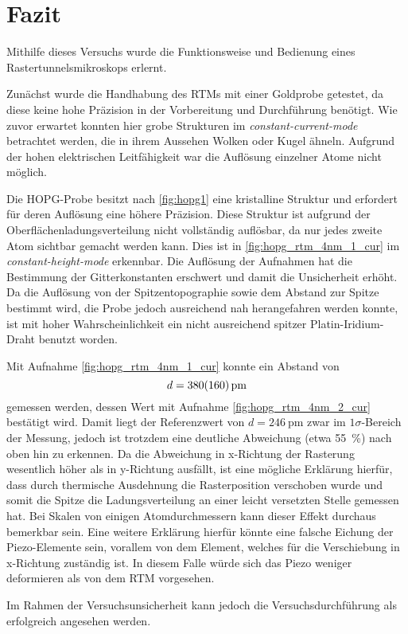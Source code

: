 \section{Fazit}\label{sec:fazit}
Mithilfe dieses Versuchs wurde die Funktionsweise und Bedienung eines Rastertunnelsmikroskops 
erlernt.\\\par
Zunächst wurde die Handhabung des RTMs mit einer Goldprobe getestet, da diese keine hohe 
Präzision in der Vorbereitung und Durchführung benötigt. Wie zuvor 
erwartet konnten hier grobe Strukturen im \emph{constant-current-mode} betrachtet werden, 
die in ihrem Aussehen Wolken oder Kugel ähneln. Aufgrund der hohen elektrischen 
Leitfähigkeit war die Auflösung einzelner Atome nicht möglich.\\\par
Die HOPG-Probe besitzt nach \cref{fig:hopg1} eine kristalline Struktur und erfordert
für deren Auflösung eine höhere Präzision. Diese Struktur ist aufgrund 
der Oberflächenladungsverteilung nicht vollständig auflösbar, da nur jedes zweite Atom sichtbar gemacht 
werden kann. Dies ist in \cref{fig:hopg_rtm_4nm_1_cur} im \emph{constant-height-mode} 
erkennbar. Die Auflösung der Aufnahmen hat die Bestimmung der Gitterkonstanten erschwert und 
damit die Unsicherheit erhöht. Da die Auflösung von der Spitzentopographie sowie dem Abstand 
zur Spitze bestimmt wird, die Probe jedoch ausreichend nah herangefahren werden konnte, 
ist mit hoher Wahrscheinlichkeit ein nicht ausreichend spitzer Platin-Iridium-Draht benutzt worden.\par 
Mit Aufnahme \cref{fig:hopg_rtm_4nm_1_cur} konnte ein Abstand von 
\[d = \SI{380\pm 160}{\pm}\]
gemessen werden, dessen Wert mit Aufnahme \cref{fig:hopg_rtm_4nm_2_cur} bestätigt wird. Damit 
liegt der Referenzwert von $d = \SI{246}{\pm}$ \cite{skript} zwar im $1\sigma$-Bereich der 
Messung, jedoch ist trotzdem eine deutliche Abweichung (etwa \SI{55}{\percent}) nach oben hin zu erkennen. Da die Abweichung 
in x-Richtung der Rasterung wesentlich höher als in y-Richtung ausfällt, ist eine mögliche Erklärung 
hierfür, dass durch thermische Ausdehnung die Rasterposition verschoben wurde und somit 
die Spitze die Ladungsverteilung an einer leicht versetzten Stelle gemessen hat. Bei Skalen von einigen
Atomdurchmessern kann dieser Effekt durchaus bemerkbar sein. Eine weitere Erklärung hierfür könnte
eine falsche Eichung der Piezo-Elemente sein, vorallem von dem Element, welches für 
die Verschiebung in x-Richtung zuständig ist. In diesem Falle würde sich das Piezo 
weniger deformieren als von dem RTM vorgesehen. \par
Im Rahmen der Versuchsunsicherheit kann jedoch die Versuchsdurchführung als erfolgreich 
angesehen werden.